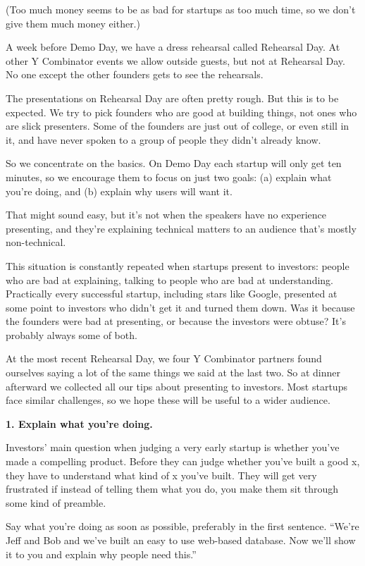 \documentclass[12pt]{book}
\begin{document}
(Too much money seems to be as bad for startups as too much time, so we
don't give them much money either.)

A week before Demo Day, we have a dress rehearsal called Rehearsal Day.
At other Y Combinator events we allow outside guests, but not at
Rehearsal Day. No one except the other founders gets to see the
rehearsals.

The presentations on Rehearsal Day are often pretty rough. But this is
to be expected. We try to pick founders who are good at building things,
not ones who are slick presenters. Some of the founders are just out of
college, or even still in it, and have never spoken to a group of people
they didn't already know.

So we concentrate on the basics. On Demo Day each startup will only get
ten minutes, so we encourage them to focus on just two goals: (a)
explain what you're doing, and (b) explain why users will want it.

That might sound easy, but it's not when the speakers have no experience
presenting, and they're explaining technical matters to an audience
that's mostly non-technical.

This situation is constantly repeated when startups present to
investors: people who are bad at explaining, talking to people who are
bad at understanding. Practically every successful startup, including
stars like Google, presented at some point to investors who didn't get
it and turned them down. Was it because the founders were bad at
presenting, or because the investors were obtuse? It's probably always
some of both.

At the most recent Rehearsal Day, we four Y Combinator partners found
ourselves saying a lot of the same things we said at the last two. So at
dinner afterward we collected all our tips about presenting to
investors. Most startups face similar challenges, so we hope these will
be useful to a wider audience.

\textbf{1. Explain what you're doing.}

Investors' main question when judging a very early startup is whether
you've made a compelling product. Before they can judge whether you've
built a good x, they have to understand what kind of x you've built.
They will get very frustrated if instead of telling them what you do,
you make them sit through some kind of preamble.

Say what you're doing as soon as possible, preferably in the first
sentence. ``We're Jeff and Bob and we've built an easy to use web-based
database. Now we'll show it to you and explain why people need this.''
\end{document}
